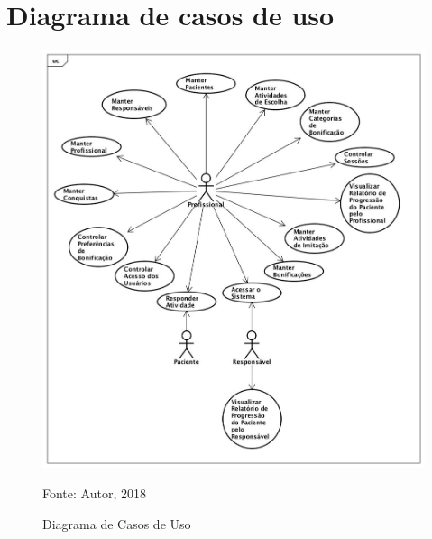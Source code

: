 \documentclass[
	12pt,				%
	openright,			%
	oneside,			%
	a4paper,			%
	english,			%
	brazil				%
	]{abntex2}
\theoremstyle{theorem}
\theoremstyle{definition}
\begin{document}
\frenchspacing 




\textual
\pagestyle{headings}








\postextual




\appendix

\chapter{Diagrama de casos de uso} \label{casodeusocap}
	\begin{figure}[H]
		\centering
		\includegraphics[width=1\linewidth]{img/casodeuso}
		\caption{Diagrama de Casos de Uso}
		Fonte: Autor, 2018
		\label{casodeuso}
	\end{figure}
\end{document}
